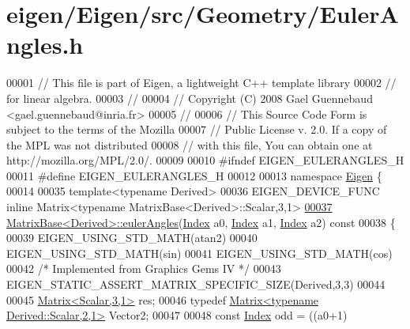 \hypertarget{eigen_2_eigen_2src_2_geometry_2_euler_angles_8h_source}{}\section{eigen/\+Eigen/src/\+Geometry/\+Euler\+Angles.h}
\label{eigen_2_eigen_2src_2_geometry_2_euler_angles_8h_source}

\begin{DoxyCode}
00001 \textcolor{comment}{// This file is part of Eigen, a lightweight C++ template library}
00002 \textcolor{comment}{// for linear algebra.}
00003 \textcolor{comment}{//}
00004 \textcolor{comment}{// Copyright (C) 2008 Gael Guennebaud <gael.guennebaud@inria.fr>}
00005 \textcolor{comment}{//}
00006 \textcolor{comment}{// This Source Code Form is subject to the terms of the Mozilla}
00007 \textcolor{comment}{// Public License v. 2.0. If a copy of the MPL was not distributed}
00008 \textcolor{comment}{// with this file, You can obtain one at http://mozilla.org/MPL/2.0/.}
00009 
00010 \textcolor{preprocessor}{#ifndef EIGEN\_EULERANGLES\_H}
00011 \textcolor{preprocessor}{#define EIGEN\_EULERANGLES\_H}
00012 
00013 \textcolor{keyword}{namespace }\hyperlink{namespace_eigen}{Eigen} \{ 
00014 
00035 \textcolor{keyword}{template}<\textcolor{keyword}{typename} Derived>
00036 EIGEN\_DEVICE\_FUNC \textcolor{keyword}{inline} Matrix<typename MatrixBase<Derived>::Scalar,3,1>
\hyperlink{group___geometry___module_ga24e8dc29689f0075ba5b1f90c02b76dc}{00037} \hyperlink{group___geometry___module_ga24e8dc29689f0075ba5b1f90c02b76dc}{MatrixBase<Derived>::eulerAngles}(\hyperlink{namespace_eigen_a62e77e0933482dafde8fe197d9a2cfde}{Index} a0, 
      \hyperlink{namespace_eigen_a62e77e0933482dafde8fe197d9a2cfde}{Index} a1, \hyperlink{namespace_eigen_a62e77e0933482dafde8fe197d9a2cfde}{Index} a2)\textcolor{keyword}{ const}
00038 \textcolor{keyword}{}\{
00039   EIGEN\_USING\_STD\_MATH(atan2)
00040   EIGEN\_USING\_STD\_MATH(sin)
00041   EIGEN\_USING\_STD\_MATH(cos)
00042   \textcolor{comment}{/* Implemented from Graphics Gems IV */}
00043   EIGEN\_STATIC\_ASSERT\_MATRIX\_SPECIFIC\_SIZE(Derived,3,3)
00044 
00045   \hyperlink{group___core___module}{Matrix<Scalar,3,1>} res;
00046   \textcolor{keyword}{typedef} \hyperlink{group___core___module_class_eigen_1_1_matrix}{Matrix<typename Derived::Scalar,2,1>} Vector2;
00047 
00048   \textcolor{keyword}{const} \hyperlink{namespace_eigen_a62e77e0933482dafde8fe197d9a2cfde}{Index} odd = ((a0+1)%

\end{DoxyCode}
